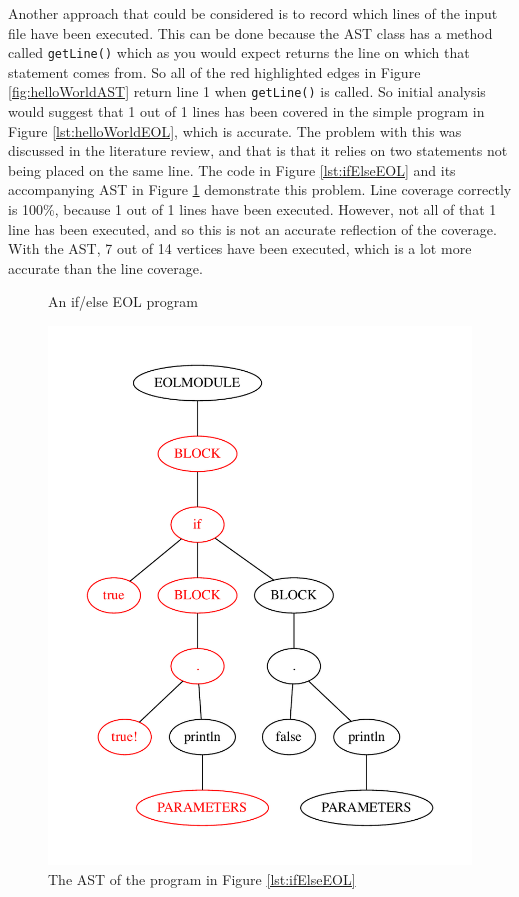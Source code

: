 Another approach that could be considered is to record which lines of the input file have been executed. This can be done because the AST class has a method called \verb+getLine()+ which as you would expect returns the line on which that statement comes from. So all of the red highlighted edges in Figure \ref{fig:helloWorldAST} return line 1 when \verb|getLine()| is called. So initial analysis would suggest that 1 out of 1 lines has been covered in the simple program in Figure \ref{lst:helloWorldEOL}, which is accurate. The problem with this was discussed in the literature review, and that is that it relies on two statements not being placed on the same line. The code in Figure \ref{lst:ifElseEOL} and its accompanying AST in Figure \ref{fig:ifElseAST} demonstrate this problem. Line coverage correctly is 100\%, because 1 out of 1 lines have been executed. However, not all of that 1 line has been executed, and so this is not an accurate reflection of the coverage. With the AST, 7 out of 14 vertices have been executed, which is a lot more accurate than the line coverage.

\begin{figure}
\centering
\begin{minipage}{.5\textwidth}
  \centering
  
  \caption{An if/else EOL program}
  \label{lst:ifElseEOL}
\end{minipage}%
\begin{minipage}{.5\textwidth}
  \centering
  \includegraphics[scale=0.5]{figures/ifElseAST.pdf}
  \caption{The AST of the program in Figure \ref{lst:ifElseEOL}}
  \label{fig:ifElseAST}
\end{minipage}
\end{figure}

